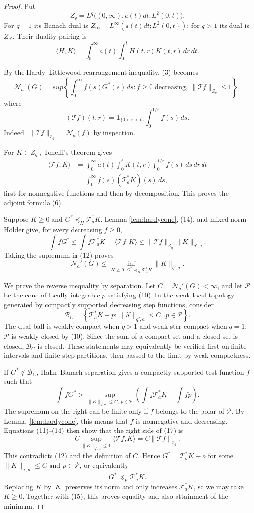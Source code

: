 \documentclass[11pt]{article}
\newcommand{\N}{\mathcal N}
\newcommand{\T}{\mathcal T}
\newcommand{\Pcone}{\mathcal P}
\begin{document}
\begin{proof}
Put
\[
 Z_q=L^q\big((0,\infty),a(t)dt;L^2(0,t)\big).
\]
For $q=1$ its Banach dual is
$Z_\infty=L^\infty(a(t)dt;L^2(0,t))$; for $q>1$ its dual is $Z_{q'}$.
Their duality pairing is
\[
 \langle H,K\rangle
 =\int_0^\infty a(t)\int_0^tH(t,r)K(t,r)\,dr\,dt.              \tag{11}
\]

By the Hardy--Littlewood rearrangement inequality, (3) becomes
\[
 \N_a'(G)=sup\left\{\int_0^\infty f(s)G^*(s)\,ds:
 f\ge0\text{ decreasing},\ \|\T f\|_{Z_q}\le1\right\},      \tag{12}
\]
where
\[
 (\T f)(t,r)=\mathbf1_{\{0<r<t\}}
                 \int_0^{1/r}f(s)\,ds.                         \tag{13}
\]
Indeed, $\|\T f\|_{Z_q}=\N_a(f)$ by inspection.

For $K\in Z_{q'}$, Tonelli's theorem gives
\begin{align*}
 \langle\T f,K\rangle
 &=\int_0^\infty a(t)\int_0^tK(t,r)
       \int_0^{1/r}f(s)\,ds\,dr\,dt\\
 &=\int_0^\infty f(s)(\T_a^*K)(s)\,ds,                        \tag{14}
\end{align*}
first for nonnegative functions and then by decomposition.  This proves the
adjoint formula (6).

Suppose $K\ge0$ and $G^*\preccurlyeq_H\T_a^*K$.  Lemma
\ref{lem:hardycone}, (14), and mixed-norm H\"older give, for every decreasing
$f\ge0$,
\[
 \int fG^*\le\int f\T_a^*K
 =\langle\T f,K\rangle
 \le\|\T f\|_{Z_q}\|K\|_{q',a}.
\]
Taking the supremum in (12) proves
\[
 \N_a'(G)\le
 \inf_{K\ge0,\,G^*\preccurlyeq_H\T_a^*K}\|K\|_{q',a}.        \tag{15}
\]

We prove the reverse inequality by separation.  Let
$C=\N_a'(G)<\infty$, and let $\Pcone$ be the cone of locally integrable $p$
satisfying (10).  In the weak local topology generated by compactly
supported decreasing step functions, consider
\[
 \mathcal B_C=\left\{\T_a^*K-p:\|K\|_{q',a}\le C,\ p\in\Pcone\right\}.
                                                                  \tag{16}
\]
The dual ball is weakly compact when $q>1$ and weak-star compact when $q=1$;
$\Pcone$ is weakly closed by (10).  Since the sum of a compact set and a
closed set is closed, $\mathcal B_C$ is closed.  These statements may
equivalently be verified first on finite intervals and finite step
partitions, then passed to the limit by weak compactness.

If $G^*\notin\mathcal B_C$, Hahn--Banach separation gives a compactly
supported test function $f$ such that
\[
 \int fG^*>
 \sup_{\|K\|_{q',a}\le C,\,p\in\Pcone}
 \left(\int f\T_a^*K-\int fp\right).                           \tag{17}
\]
The supremum on the right can be finite only if $f$ belongs to the polar of
$\Pcone$.  By Lemma~\ref{lem:hardycone}, this means that $f$ is
nonnegative and decreasing.  Equations (11)--(14) then show that the right
side of (17) is
\[
 C\sup_{\|K\|_{q',a}\le1}\langle\T f,K\rangle
 =C\|\T f\|_{Z_q}.
\]
This contradicts (12) and the definition of $C$.  Hence
$G^*=\T_a^*K-p$ for some $\|K\|_{q',a}\le C$ and $p\in\Pcone$, or
equivalently
\[
 G^*\preccurlyeq_H\T_a^*K.
\]
Replacing $K$ by $|K|$ preserves its norm and only increases $\T_a^*K$, so
we may take $K\ge0$.  Together with (15), this proves equality and also
attainment of the minimum.


\end{proof}
\end{document}
